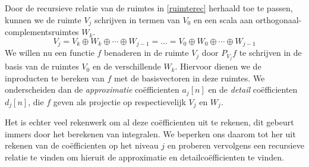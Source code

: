\documentclass[11pt]{uvamath}
\theoremstyle{plain}
\theoremstyle{definition}
\theoremstyle{remark}
\begin{document}
Door de recursieve relatie van de ruimtes in \ref{ruimterec} herhaald toe te passen,
kunnen we de ruimte $V_j$ schrijven in termen van $V_0$ en een scala aan
orthogonaal-complementsruimtes $W_k$.
\begin{equation}
  \label{ruimte_splitsing}
  V_j = V_k \oplus W_k \oplus \cdots \oplus W_{j-1} = \ldots
  = V_0 \oplus W_0 \oplus \cdots \oplus W_{j-1}
\end{equation}
We willen nu een functie $f$ benaderen in de ruimte $V_j$ door $P_{V_j}f$ te schrijven in
de basis van de ruimtes $V_0$ en de verschillende $W_k$. Hiervoor dienen we de inproducten
te bereken van $f$ met de basisvectoren in deze ruimtes.
We onderscheiden dan de \emph{approximatie}
co\"efficienten $a_j[n]$ en de \emph{detail} co\"efficienten $d_j[n]$, die
$f$ geven als projectie op  respectievelijk $V_j$ en $W_j$.

Het is echter veel rekenwerk om al deze co\"efficienten uit te rekenen, dit gebeurt immers
door het berekenen van integralen. We beperken ons daarom tot her uit rekenen van de
co\"efficienten op het niveau $j$ en proberen vervolgens een recursieve relatie te vinden
om hieruit de approximatie en detailco\"efficienten te vinden.
\end{document}
